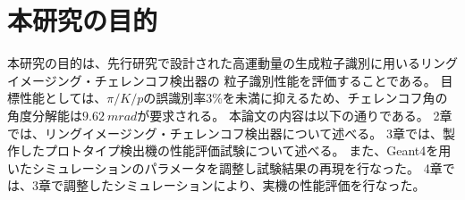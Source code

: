 \section{本研究の目的}
本研究の目的は、先行研究で設計された高運動量の生成粒子識別に用いるリングイメージング・チェレンコフ検出器の
粒子識別性能を評価することである。
目標性能としては、$\pi/K/p$の誤識別率3\%を未満に抑えるため、チェレンコフ角の角度分解能は$\SI{9.62}{mrad}$が要求される\cite{ref4}。
本論文の内容は以下の通りである。
2章では、リングイメージング・チェレンコフ検出器について述べる。
3章では、製作したプロトタイプ検出機の性能評価試験について述べる。
また、Geant4を用いたシミュレーションのパラメータを調整し試験結果の再現を行なった。
4章では、3章で調整したシミュレーションにより、実機の性能評価を行なった。

